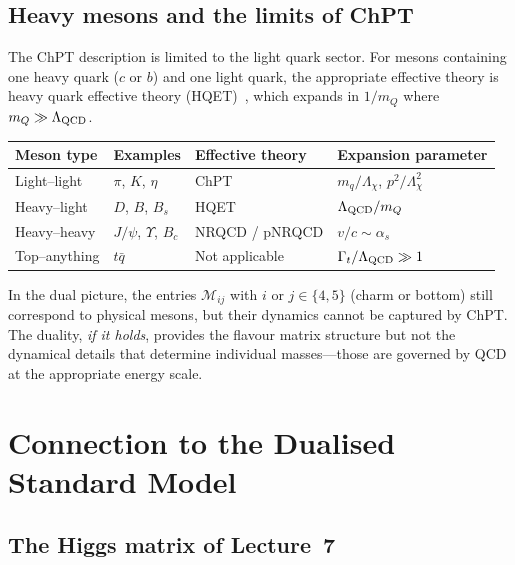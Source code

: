 \documentclass[11pt,a4paper]{article}
\newcommand{\Lchi}{\Lambda_\chi}
\begin{document}
\subsection{Heavy mesons and the limits of ChPT}
\label{sec:heavy-mesons}

The ChPT description is limited to the light quark sector.  For mesons
containing one heavy quark ($c$ or $b$) and one light quark, the
appropriate effective theory is heavy quark effective theory
(HQET)~\cite{ManoharWise2000}, which expands in $1/m_Q$ where
$m_Q \gg \Lambda_{\mathrm{QCD}}$.

\begin{center}
\renewcommand{\arraystretch}{1.2}
\begin{tabular}{llll}
\toprule
\textbf{Meson type} & \textbf{Examples} & \textbf{Effective theory}
  & \textbf{Expansion parameter} \\
\midrule
Light--light & $\pi$, $K$, $\eta$ & ChPT
  & $m_q/\Lchi$, $p^2/\Lchi^2$ \\
Heavy--light & $D$, $B$, $B_s$ & HQET
  & $\Lambda_{\mathrm{QCD}}/m_Q$ \\
Heavy--heavy & $J/\psi$, $\Upsilon$, $B_c$
  & NRQCD / pNRQCD & $v/c \sim \alpha_s$ \\
Top--anything & $t\bar{q}$ & Not applicable
  & $\Gamma_t / \Lambda_{\mathrm{QCD}} \gg 1$ \\
\bottomrule
\end{tabular}
\end{center}

In the dual picture, the entries $\mathcal{M}_{ij}$ with $i$ or
$j \in \{4,5\}$ (charm or bottom) still correspond to physical mesons,
but their dynamics cannot be captured by ChPT.  The duality, \emph{if
it holds}, provides the flavour matrix structure but not the dynamical
details that determine individual masses---those are governed by QCD
at the appropriate energy scale.


\section{Connection to the Dualised Standard Model}
\label{sec:dsm-connection}

\subsection{The Higgs matrix of Lecture~7}
\end{document}
